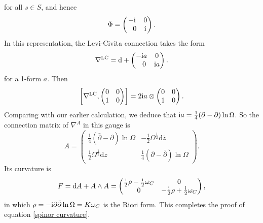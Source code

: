 \documentclass[pdftex]{sigma}
\newcommand{\1}{{\mathbb{1}}}
\def \d{\mathrm{d}}
\newcommand{\ol}{\overline}
\numberwithin{equation}{section}
\begin{document}
for all $s\in S$, and hence
\begin{equation}
\label{spinor Phi}
\Phi = \begin{pmatrix}-{\rm i}&0\\\hphantom{-}0&{\rm i}\end{pmatrix}.
\end{equation}
In this representation, the Levi-Civita connection takes the form
\begin{equation*}
\nabla^{\rm LC}=\d+\begin{pmatrix}-{\rm i} a & 0 \\ \hphantom{-}0 & {\rm i} a\end{pmatrix}.
\end{equation*}
for a 1-form $a$. Then
\begin{equation*}
\left[ \nabla^{\rm LC},\begin{pmatrix}0&0\\1&0\end{pmatrix}\right] = 2{\rm i} a\otimes \begin{pmatrix}0&0\\1&0\end{pmatrix}.
\end{equation*}
Comparing with our earlier calculation, we deduce that ${\rm i} a = \frac{1}{4}(\partial-\bar{\partial})\ln\Omega$. So the connection matrix of $\nabla^A$ in this gauge is
\begin{equation*}
A = \begin{pmatrix} \frac{1}{4}(\bar{\partial}-\partial)\ln\Omega & -\frac{1}{2}\Omega^{\frac12}\d\ol{z} \\ \frac{1}{2}\Omega^{\frac12}\d z & \frac{1}{4}(\partial-\bar{\partial})\ln\Omega\end{pmatrix}.
\end{equation*}
Its curvature is
\begin{equation}
\label{spinor F}
F=\d A+A\wedge A = \begin{pmatrix} \frac{{\rm i}}{2}\rho -\frac{{\rm i}}{2}\omega_C & 0 \\ 0 & -\frac{{\rm i}}{2}\rho +\frac{{\rm i}}{2}\omega_C\end{pmatrix},
\end{equation}
in which $\rho=-{\rm i}\partial\bar{\partial}\ln\Omega=K\omega_C$ is the Ricci form. This completes the proof of equation \eqref{spinor curvature}.
\end{document}
